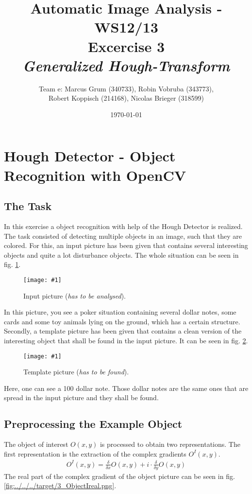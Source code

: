 \documentclass[a4paper,headings=small]{scrartcl}
\title{Automatic Image Analysis - WS12/13 \\ Excercise 3 \\ \emph{Generalized Hough-Transform}}
\author{Team e: Marcus Grum (340733), Robin Vobruba (343773), \\ Robert Koppisch (214168), Nicolas Brieger (318599)}
\date{\today}
\numberwithin{equation}{section} %
\numberwithin{figure}{section}   %
\newcommand{\image}[3]{
	\begin{figure}[htbp]
		\centering
		\texttt{[image: \#1]}
		\caption{#3}
		\label{fig:#1}
	\end{figure}
}
\newcommand{\generatedImgRoot}{../../../target}
\newcommand{\targetFlag}{} %
\begin{document}
\maketitle

\section{Hough Detector - Object Recognition with OpenCV}


\subsection{The Task}
In this exercise a object recognition with help of the Hough Detector is realized. 
The task consisted of detecting multiple objects in an image, such that they are colored.
For this, an input picture has been given that contains several interesting objects and 
quite a lot disturbance objects. The whole situation can be seen in 
fig. \ref{fig:\generatedImgRoot/\targetFlag1_Input.jpg}.

\image{\generatedImgRoot/\targetFlag1_Input.jpg}{0.4}{%
		Input picture (\emph{has to be analysed}).}

In this picture, you see a poker situation containing several dollar notes, some cards
and some toy animals lying on the ground, which has a certain structure.
Secondly, a template picture has been given that contains a clean version of the
interesting object that shall be found in the input picture.
It can be seen in fig. \ref{fig:\generatedImgRoot/\targetFlag2_Template.jpg}.

\image{\generatedImgRoot/\targetFlag2_Template.jpg}{0.3}{%
		Template picture (\emph{has to be found}).}

Here, one can see a 100 dollar note. Those dollar notes are the same ones
that are spread in the input picture and they shall be found.

\subsection{Preprocessing the Example Object}

The object of interest $O(x,y)$ is processed to obtain two representations.
The first representation is the extraction of the complex gradients $O^I(x,y)$.
\begin{align}
O^I(x,y) = \frac{\delta}{\delta x} O(x,y) + i \cdot \frac{\delta}{\delta y} O(x,y) 
\end{align}
The real part of the complex gradient of the object picture can be seen in 
fig. \ref{fig:\generatedImgRoot/\targetFlag3_ObjectIreal.png}.
\end{document}
